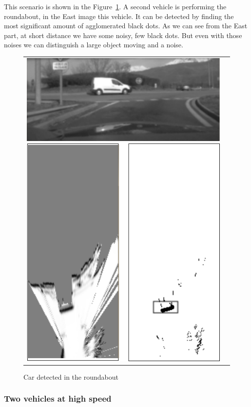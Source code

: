 This scenario is shown in the Figure~\ref{fig:result:scenetwocarrondepoint}. A second vehicle is performing the roundabout, in the East image this vehicle. It can be detected by finding the most significant amount of agglomerated black dots. As we can see from the East part, at short distance we have some noisy, few black dots. But even with those noises we can distinguish a large object moving and a noise.

\begin{figure}[H]
   \centering
     \begin{tabular}{lr}
       \includegraphics[scale=0.60]{img/fig:result:scenetwocarrondepoint}
     \end{tabular}
   \caption{Car detected in the roundabout}
   \label{fig:result:scenetwocarrondepoint}
\end{figure}

\subsubsection{Two vehicles at high speed}

